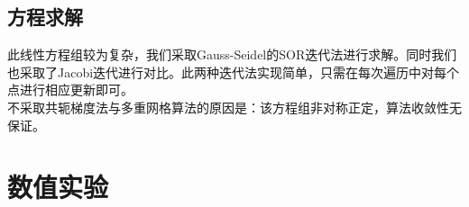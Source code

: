 \documentclass[11pt,a4 paper,one side]{article}
\begin{document}
\subsection{方程求解}
此线性方程组较为复杂，我们采取Gauss-Seidel的SOR迭代法进行求解。同时我们也采取了Jacobi迭代进行对比。此两种迭代法实现简单，只需在每次遍历中对每个点进行相应更新即可。
\\ 不采取共轭梯度法与多重网格算法的原因是：该方程组非对称正定，算法收敛性无保证。
\section{数值实验}
\end{document}
